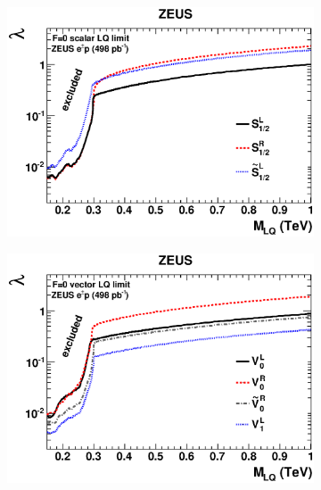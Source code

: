 \begin{figure}
  \centering
  \begin{subfigure}[b]{0.49\textwidth}
    \includegraphics[width=\textwidth]{tex/theory/fig/limits/DESY-12-077_12.eps}
    \caption{}
    \label{fig:hera-F0S}
  \end{subfigure}
  \begin{subfigure}[b]{0.49\textwidth}
    \includegraphics[width=\textwidth]{tex/theory/fig/limits/DESY-12-077_13.eps}
    \caption{}
    \label{fig:hera-F0V}
  \end{subfigure}
 \begin{subfigure}[b]{0.49\textwidth}

\end{subfigure}
\end{figure}
